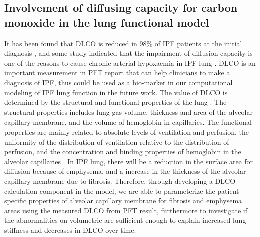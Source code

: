 \subsection{Involvement of diffusing capacity for carbon monoxide in the lung functional model}
It has been found that DLCO is reduced in 98\% of IPF patients at the initial diagnosis \citep{cortes2014idiopathic}, and some study indicated that the impairment of diffusion capacity is one of the reasons to cause chronic arterial hypoxaemia in IPF lung \citep{plantier2018physiology}. DLCO is an important measurement in PFT report that can help clinicians to make a diagnosis of IPF, thus could be used as a bio-marker in our computational modeling of IPF lung function in the future work. The value of DLCO is determined by the structural and functional properties of the lung \citep{graham20172017}. The structural properties includes lung gas volume, thickness and area of the alveolar capillary membrane, and the volume of hemoglobin in capillaries. The functional properties are mainly related to absolute levels of ventilation and perfusion, the uniformity of the distribution of ventilation relative to the distribution of perfusion, and the concentration and binding properties of hemoglobin in the alveolar capillaries \citep{graham20172017}. In IPF lung, there will be a reduction in the surface area for diffusion because of emphysema, and a increase in the thickness of the alveolar capillary membrane due to fibrosis. Therefore, through developing a DLCO calculation component in the model, we are able to parameterize the patient-specific properties of alveolar capillary membrane for fibrosis and emphysema areas using the measured DLCO from PFT result, furthermore to investigate if the abnormalities on volumetric are sufficient enough to explain increased lung stiffness and decreases in DLCO over time.   


